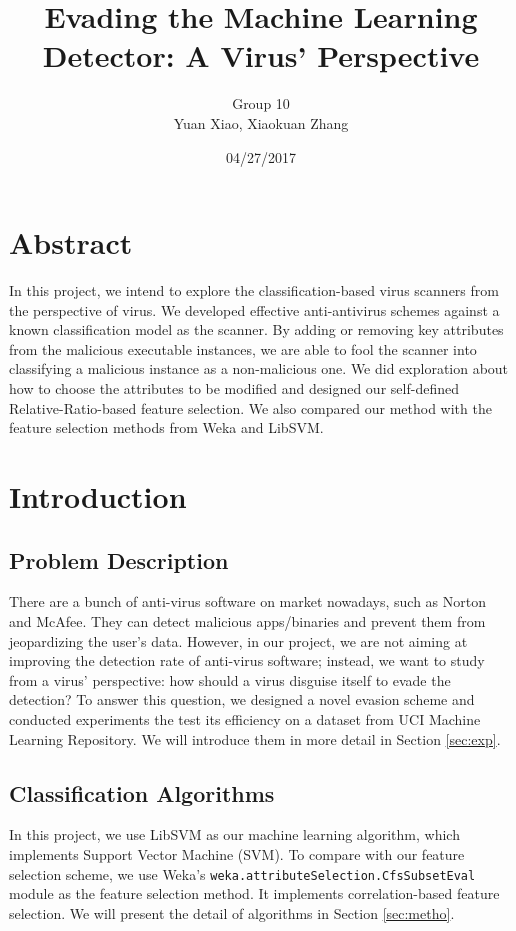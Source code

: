 \documentclass[11pt]{article}
\title{Evading the Machine Learning Detector: A Virus’ Perspective}
\author{Group 10 \\ Yuan Xiao, Xiaokuan Zhang}
\date{04/27/2017}
\begin{document}
\maketitle
\section*{Abstract}
In this project, we intend to explore the classification-based virus scanners from the perspective of virus. We developed effective anti-antivirus schemes against a known classification model as the scanner. By adding or removing key attributes from the malicious executable instances, we are able to fool the scanner into classifying a malicious instance as a non-malicious one. We did exploration about how to choose the attributes to be modified and designed our self-defined Relative-Ratio-based feature selection. We also compared our method with the feature selection methods from Weka and LibSVM.


\section{Introduction}

\subsection{Problem Description}
There are a bunch of anti-virus software on market nowadays, such as Norton and McAfee. They can detect malicious apps/binaries and prevent them from jeopardizing the user's data. However, in our project, we are not aiming at improving the detection rate of anti-virus software; instead, we want to study from a virus' perspective: how should a virus disguise itself to evade the detection? To answer this question, we designed a novel evasion scheme and conducted experiments the test its efficiency on a dataset from UCI Machine Learning Repository. We will introduce them in more detail in Section \ref{sec:exp}.

\subsection{Classification Algorithms}
In this project, we use LibSVM \cite{CC01a} as our machine learning  algorithm, which implements Support Vector Machine (SVM). To compare with our feature selection scheme, we use Weka's \texttt{weka.attributeSelection.CfsSubsetEval} module as the feature selection method. It implements correlation-based feature selection. We will present the detail of algorithms in Section \ref{sec:metho}.
\end{document}
